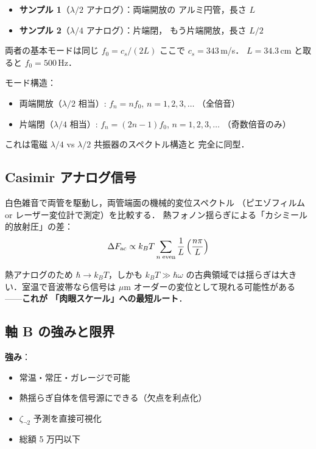 \documentclass[11pt,a4paper]{article}
\begin{document}
\begin{itemize}
\item \textbf{サンプル 1}（$\lambda/2$ アナログ）：両端開放の
アルミ円管，長さ $L$
\item \textbf{サンプル 2}（$\lambda/4$ アナログ）：片端閉，
もう片端開放，長さ $L/2$
\end{itemize}

両者の基本モードは同じ $f_0 = c_s/(2L)$ ここで $c_s=343$\,m/s．
$L=34.3$\,cm と取ると $f_0 = 500$\,Hz．

モード構造：
\begin{itemize}
\item 両端開放（$\lambda/2$ 相当）: $f_n = n f_0$, $n=1,2,3,\ldots$ （全倍音）
\item 片端閉（$\lambda/4$ 相当）: $f_n = (2n-1) f_0$, $n=1,2,3,\ldots$ （奇数倍音のみ）
\end{itemize}

これは電磁 $\lambda/4$ vs $\lambda/2$ 共振器のスペクトル構造と
完全に同型．

\subsection{Casimir アナログ信号}

白色雑音で両管を駆動し，両管端面の機械的変位スペクトル
（ピエゾフィルム or レーザー変位計で測定）を比較する．
熱フォノン揺らぎによる「カシミール的放射圧」の差：
\begin{equation}
  \Delta F_{\rm ac} \propto k_B T \sum_{n\;\text{even}} \frac{1}{L}\left(\frac{n\pi}{L}\right)
\end{equation}

熱アナログのため $\hbar \to k_B T$，しかも $k_BT \gg \hbar\omega$
の古典領域では揺らぎは大きい．室温で音波帯なら信号は
$\mu$m オーダーの変位として現れる可能性がある——\textbf{これが
「肉眼スケール」への最短ルート}．

\subsection{軸 B の強みと限界}

\textbf{強み}：
\begin{itemize}
\item 常温・常圧・ガレージで可能
\item 熱揺らぎ自体を信号源にできる（欠点を利点化）
\item $\zeta_{\neg 2}$ 予測を直接可視化
\item 総額 5 万円以下
\end{itemize}
\end{document}
